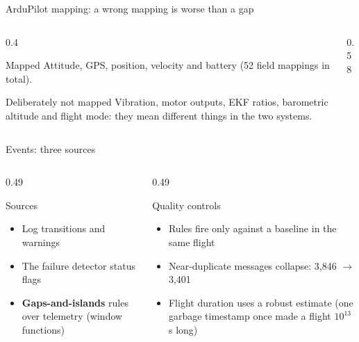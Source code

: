 \documentclass[aspectratio=169,10pt]{beamer}
\newcommand{\listing}[1]{}
\newcommand{\listingr}[3]{}
\begin{document}
\begin{frame}[shrink=5]{ArduPilot mapping: a wrong mapping is worse than a gap}
\begin{columns}[T]
\begin{column}{0.4\textwidth}
\begin{block}{Mapped}
Attitude, GPS, position, velocity and battery (52 field mappings in total).
\end{block}
\begin{block}{Deliberately not mapped}
Vibration, motor outputs, EKF ratios, barometric altitude and flight mode: they mean different things in the two systems.
\end{block}
\end{column}
\begin{column}{0.58\textwidth}
\listingr{code-ardupilot-map}{1}{9}
\end{column}
\end{columns}
\end{frame}

\begin{frame}[shrink=5]{Events: three sources}
\begin{columns}[T]
\begin{column}{0.49\textwidth}
\begin{block}{Sources}
\begin{itemize}
  \item Log transitions and warnings
  \item The failure detector status flags
  \item \textbf{Gaps-and-islands} rules over telemetry (window functions)
\end{itemize}
\end{block}
\end{column}
\begin{column}{0.49\textwidth}
\begin{block}{Quality controls}
\begin{itemize}
  \item Rules fire only against a baseline in the same flight
  \item Near-duplicate messages collapse: 3,846 $\to$ 3,401
  \item Flight duration uses a robust estimate (one garbage timestamp once made a flight $10^{13}$ s long)
\end{itemize}
\end{block}
\end{column}
\end{columns}
\vspace{0.3em}
\listing{code-islands}
\end{frame}
\end{document}
